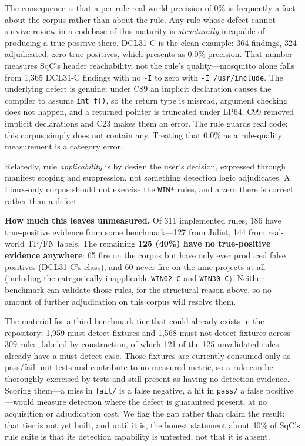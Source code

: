 The consequence is that a per-rule real-world precision of 0\% is
frequently a fact about the corpus rather than about the rule.  Any
rule whose defect cannot survive review in a codebase of this maturity
is \emph{structurally} incapable of producing a true positive there.
DCL31-C is the clean example: 364 findings, 324 adjudicated, zero true
positives, which presents as 0.0\% precision.  That number measures
SqC's header reachability, not the rule's quality---mosquitto alone
falls from 1,365 DCL31-C findings with no \texttt{-I} to zero with
\texttt{-I /usr/include}.  The underlying defect is genuine: under C89
an implicit declaration causes the compiler to assume \texttt{int
f()}, so the return type is misread, argument checking does not
happen, and a returned pointer is truncated under LP64.  C99 removed
implicit declarations and C23 makes them an error.  The rule guards
real code; this corpus simply does not contain any.  Treating that
0.0\% as a rule-quality measurement is a category error.

Relatedly, rule \emph{applicability} is by design the user's decision,
expressed through manifest scoping and suppression, not something
detection logic adjudicates.  A Linux-only corpus should not exercise
the \texttt{WIN*} rules, and a zero there is correct rather than a
defect.

\textbf{How much this leaves unmeasured.}  Of 311 implemented rules,
186 have true-positive evidence from some benchmark---127 from Juliet,
144 from real-world TP/FN labels.  The remaining \textbf{125 (40\%)
have no true-positive evidence anywhere}: 65 fire on the corpus but
have only ever produced false positives (DCL31-C's class), and 60
never fire on the nine projects at all (including the categorically
inapplicable \texttt{WIN02-C} and \texttt{WIN30-C}).  Neither
benchmark can validate those rules, for the structural reason above,
so no amount of further adjudication on this corpus will resolve them.

The material for a third benchmark tier that could already exists in
the repository: 1,959 must-detect fixtures and 1,568 must-not-detect
fixtures across 309 rules, labeled by construction, of which 121 of
the 125 unvalidated rules already have a must-detect case.  Those
fixtures are currently consumed only as pass/fail unit tests and
contribute to no measured metric, so a rule can be thoroughly
exercised by tests and still present as having no detection evidence.
Scoring them---a miss in \texttt{fail/} is a false negative, a hit in
\texttt{pass/} a false positive---would measure detection where the
defect is guaranteed present, at no acquisition or adjudication cost.
We flag the gap rather than claim the result: that tier is not yet
built, and until it is, the honest statement about 40\% of SqC's rule
suite is that its detection capability is untested, not that it is
absent.
